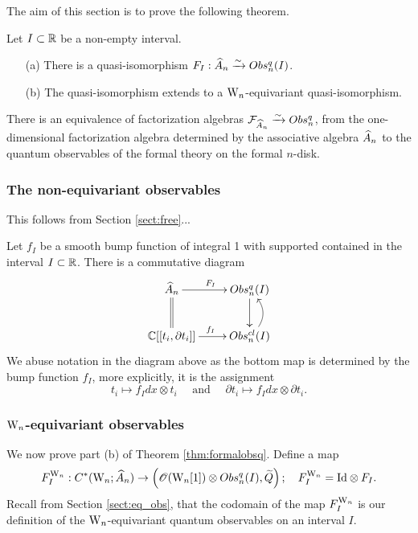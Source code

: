 The aim of this section is to prove the following theorem.

\begin{thm}\label{thm:formalobsq} Let $I \subset \mathbb R$ be a non-empty interval.  
\begin{itemize}
\item[(a)] There is a quasi-isomorphism $F_I : \widehat{A}_n \xrightarrow{\sim} Obs^q_n (I)$.  
\item[(b)] The quasi-isomorphism extends to a ${{\rm W}_n}$-equivariant quasi-isomorphism.
\end{itemize}
\end{thm}

\begin{cor}
There is an equivalence of factorization algebras $\mathcal F_{\widehat{A}_n} \xrightarrow{\sim} Obs^q_n$, from the one-dimensional factorization algebra determined by the associative algebra $\widehat{A}_n$ to the quantum observables of the formal theory on the formal $n$-disk.
\end{cor}


\subsubsection{The non-equivariant observables}

This follows from Section \ref{sect:free}...

Let $f_I$ be a smooth bump function of integral 1 with supported contained in the interval $I \subset \mathbb R$.  There is a commutative diagram
\[
\xymatrix{
\hA_n \ar[r]^{F_I} \ar@{=}[d] & Obs^q_n (I) \ar[d]\\ \CC[[t_i , \partial t_i ]] \ar[r]^{f_I} & Obs^{cl}_n (I) \ar@/_1pc/[u]
}
\]
We abuse notation in the diagram above as the bottom map is determined by the bump function $f_I$, more explicitly, it is the assignment
\[
t_i \mapsto f_I dx \otimes t_i \quad \text{ and } \quad \partial t_i \mapsto f_I dx \otimes \partial t_i.
\]

\subsubsection{${{\rm W}_n}$-equivariant observables}

We now prove part (b) of Theorem \ref{thm:formalobsq}.  Define a map
\[
F_I^{{\rm W}_n} : C^\ast ({{\rm W}_n} ; \widehat{A}_n) \to \left ( \mathscr O ({{\rm W}_n}[1]) \otimes Obs^q_n (I) , \widetilde{Q} \right ); \quad F_I^{{\rm W}_n} = \mathrm{Id} \otimes F_I.
\]
Recall from Section \ref{sect:eq_obs}, that the codomain of the map $F^{{\rm W}_n}_I$ is our definition of the ${{\rm W}_n}$-equivariant quantum observables on an interval $I$.

